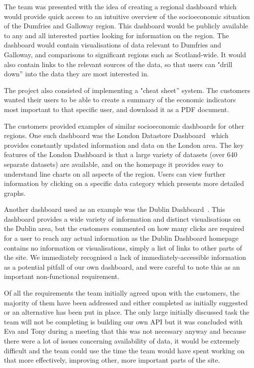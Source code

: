 \documentclass{l3proj}
\begin{document}
The team was presented with the idea of creating a regional dashboard which would provide quick access to an intuitive overview of the socioeconomic situation of the Dumfries and Galloway region. This dashboard would be publicly available to any and all interested parties looking for information on the region. The dashboard would contain visualisations of data relevant to Dumfries and Galloway, and comparisons to significant regions such as Scotland-wide. It would also contain links to the relevant sources of the data, so that users can "drill down'' into the data they are most interested in.

The project also consisted of implementing a "cheat sheet'' system. The customers wanted their users to be able to create a summary of the economic indicators most important to that specific user, and download it as a PDF document.

The customers provided examples of similar socioeconomic dashboards for other regions. One such dashboard was the London Datastore Dashboard~\cite{LondonDashboard} which provides constantly updated information and data on the London area. The key features of the London Dashboard is that a large variety of datasets (over 640 separate datasets) are available, and on the homepage it provides easy to understand line charts on all aspects of the region. Users can view further information by clicking on a specific data category which presents more detailed graphs.

Another dashboard used as an example was the Dublin Dashboard~\cite{DublinDashboard}. This dashboard provides a wide variety of information and distinct visualisations on the Dublin area, but the customers commented on how many clicks are required for a user to reach any actual information as the Dublin Dashboard homepage contains no information or visualisations, simply a list of links to other parts of the site. We immediately recognised a lack of immediately-accessible information as a potential pitfall of our own dashboard, and were careful to note this as an important non-functional requirement.


Of all the requirements the team initially agreed upon with the customers, the majority of them have been addressed and either completed as initially suggested
or an alternative has been put in place. The only large initially discussed task the team will not be completing is building our own API but it was concluded
with Eva and Tony during a meeting that this was not necessary anyway and because there were a lot of issues concerning availability of data, it would be
extremely difficult and the team could use the time the team would have spent working on that more effectively, improving other, more important parts of the site.
\end{document}
